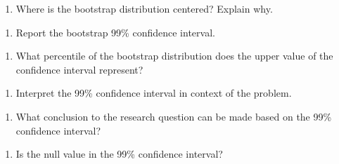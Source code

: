 \documentclass[
]{report}
\providecommand{\tightlist}{%
  \setlength{\itemsep}{0pt}\setlength{\parskip}{0pt}}
\begin{document}
\begin{enumerate}
\def\labelenumi{\arabic{enumi}.}
\setcounter{enumi}{7}
\tightlist
\item
  Where is the bootstrap distribution centered? Explain why.
\end{enumerate}

\vspace{0.8in}

\begin{enumerate}
\def\labelenumi{\arabic{enumi}.}
\setcounter{enumi}{8}
\tightlist
\item
  Report the bootstrap 99\% confidence interval.
\end{enumerate}

\vspace{0.4in}

\begin{enumerate}
\def\labelenumi{\arabic{enumi}.}
\setcounter{enumi}{9}
\tightlist
\item
  What percentile of the bootstrap distribution does the upper value of the confidence interval represent?
\end{enumerate}

\vspace{0.3in}

\begin{enumerate}
\def\labelenumi{\arabic{enumi}.}
\setcounter{enumi}{10}
\tightlist
\item
  Interpret the 99\% confidence interval in context of the problem.
\end{enumerate}

\vspace{1in}

\begin{enumerate}
\def\labelenumi{\arabic{enumi}.}
\setcounter{enumi}{11}
\tightlist
\item
  What conclusion to the research question can be made based on the 99\% confidence interval?
\end{enumerate}

\vspace{0.8in}

\begin{enumerate}
\def\labelenumi{\arabic{enumi}.}
\setcounter{enumi}{12}
\tightlist
\item
  Is the null value in the 99\% confidence interval?
\end{enumerate}

\vspace{0.8in}
\end{document}
